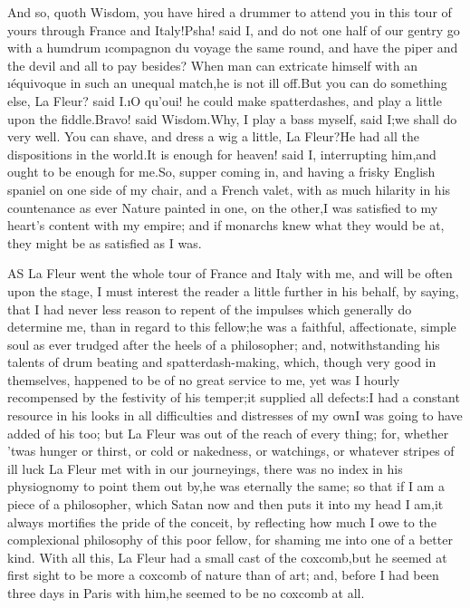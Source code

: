 \documentclass[twoside]{article}
\begin{document}
\tsk And so, quoth Wisdom, you have hired a drummer to attend you in this
tour of yours through France and Italy!\tsk Psha! said I, and do not one half
of our gentry go with a humdrum \i{compagnon du voyage} the same round, and
have the piper and the devil and all to pay besides?  When man can
extricate himself with an \i{équivoque} in such an unequal match,\tsk he is not
ill off.\tsk But you can do something else, La Fleur? said I.\tsk \i{O qu’oui}! he
could make spatterdashes, and play a little upon the fiddle.\tsk Bravo! said
Wisdom.\tsk Why, I play a bass myself, said I;\tsk we shall do very well.  You
can shave, and dress a wig a little, La Fleur?\tsk He had all the
dispositions in the world.\tsk It is enough for heaven! said I, interrupting
him,\tsk and ought to be enough for me.\tsk So, supper coming in, and having a
frisky English spaniel on one side of my chair, and a French valet, with
as much hilarity in his countenance as ever Nature painted in one, on the
other,\tsk I was satisfied to my heart’s content with my empire; and if
monarchs knew what they would be at, they might be as satisfied as I was.






AS La Fleur went the whole tour of France and Italy with me, and will be
often upon the stage, I must interest the reader a little further in his
behalf, by saying, that I had never less reason to repent of the impulses
which generally do determine me, than in regard to this fellow;\tsk he was a
faithful, affectionate, simple soul as ever trudged after the heels of a
philosopher; and, notwithstanding his talents of drum beating and
spatterdash-making, which, though very good in themselves, happened to be
of no great service to me, yet was I hourly recompensed by the festivity
of his temper;\tsk it supplied all defects:\tsk I had a constant resource in his
looks in all difficulties and distresses of my own\tsk I was going to have
added of his too; but La Fleur was out of the reach of every thing; for,
whether ’twas hunger or thirst, or cold or nakedness, or watchings, or
whatever stripes of ill luck La Fleur met with in our journeyings, there
was no index in his physiognomy to point them out by,\tsk he was eternally
the same; so that if I am a piece of a philosopher, which Satan now and
then puts it into my head I am,\tsk it always mortifies the pride of the
conceit, by reflecting how much I owe to the complexional philosophy of
this poor fellow, for shaming me into one of a better kind.  With all
this, La Fleur had a small cast of the coxcomb,\tsk but he seemed at first
sight to be more a coxcomb of nature than of art; and, before I had been
three days in Paris with him,\tsk he seemed to be no coxcomb at all.
\end{document}
